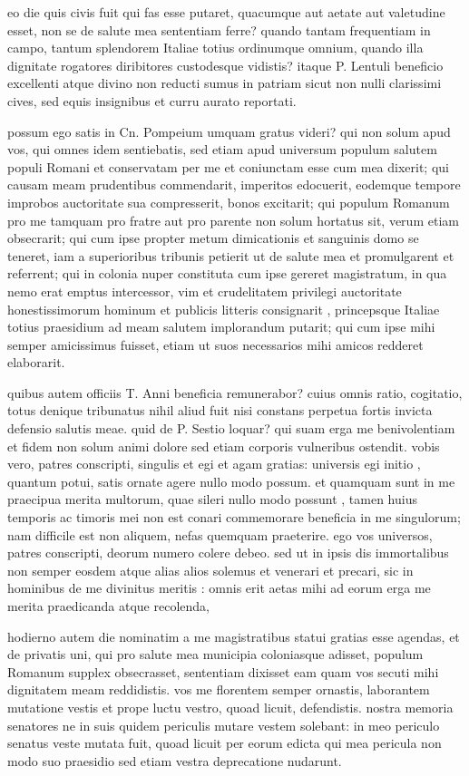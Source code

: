  eo die quis civis fuit qui fas esse putaret, quacumque aut aetate aut valetudine esset, non se de salute mea sententiam ferre? quando tantam frequentiam in campo, tantum splendorem Italiae totius ordinumque omnium, quando illa dignitate rogatores diribitores custodesque vidistis? itaque P. Lentuli beneficio excellenti atque divino non reducti sumus in patriam sicut non nulli clarissimi cives, sed equis insignibus et curru aurato reportati.

 possum ego satis in Cn. Pompeium umquam gratus videri? qui non solum apud vos, qui omnes idem sentiebatis, sed etiam apud universum populum salutem populi Romani et conservatam per me et coniunctam esse cum mea dixerit; qui causam meam prudentibus commendarit, imperitos edocuerit, eodemque tempore improbos auctoritate sua compresserit, bonos excitarit; qui populum Romanum pro me tamquam pro fratre aut pro parente non solum hortatus sit, verum etiam obsecrarit; qui cum ipse propter metum dimicationis et sanguinis domo se teneret, iam a superioribus tribunis petierit ut de salute mea et promulgarent et referrent; qui in colonia nuper constituta cum ipse gereret magistratum, in qua nemo erat emptus intercessor, vim et crudelitatem privilegi auctoritate honestissimorum hominum et publicis litteris consignarit , princepsque Italiae totius praesidium ad meam salutem implorandum putarit; qui cum ipse mihi semper amicissimus fuisset, etiam ut suos necessarios mihi amicos redderet elaborarit.

 quibus autem officiis T. Anni beneficia remunerabor? cuius omnis ratio, cogitatio, totus denique tribunatus nihil aliud fuit nisi constans perpetua fortis invicta defensio salutis meae. quid de P. Sestio loquar? qui suam erga me benivolentiam et fidem non solum animi dolore sed etiam corporis vulneribus ostendit. vobis vero, patres conscripti, singulis et egi et agam gratias: universis egi initio , quantum potui, satis ornate agere nullo modo possum. et quamquam sunt in me praecipua merita multorum, quae sileri nullo modo possunt , tamen huius temporis ac timoris mei non est conari commemorare beneficia in me singulorum; nam difficile est non aliquem, nefas quemquam praeterire. ego vos universos, patres conscripti, deorum numero colere debeo. sed ut in ipsis dis immortalibus non semper eosdem atque alias alios solemus et venerari et precari, sic in hominibus de me divinitus meritis : omnis erit aetas mihi ad eorum erga me merita praedicanda atque recolenda,

 hodierno autem die nominatim a me magistratibus statui gratias esse agendas, et de privatis uni, qui pro salute mea municipia coloniasque adisset, populum Romanum supplex obsecrasset, sententiam dixisset eam quam vos secuti mihi dignitatem meam reddidistis. vos me florentem semper ornastis, laborantem mutatione vestis et prope luctu vestro, quoad licuit, defendistis. nostra memoria senatores ne in suis quidem periculis mutare vestem solebant: in meo periculo senatus veste mutata fuit, quoad licuit per eorum edicta qui mea pericula non modo suo praesidio sed etiam vestra deprecatione nudarunt.

